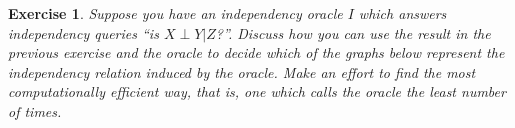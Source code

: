 \documentclass{amsart}
\theoremstyle{plain}
\newtheorem{exercise}{Exercise}
\begin{document}
\begin{exercise}
  Suppose you have an independency oracle $I$ which answers independency queries ``is
  $X\perp Y|Z$?''. Discuss how you can use the result in the previous exercise and the oracle to
  decide which of the graphs below represent the independency relation induced by the oracle. Make
  an effort to find the most computationally efficient way, that is, one which calls the oracle the
  least number of times.

  \begin{figure}[h]
  \end{figure}
\end{exercise}
\end{document}
